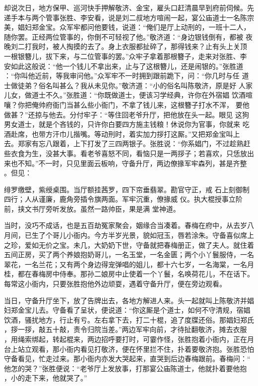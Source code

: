 却说次日，地方保甲、巡河快手押解敬济、金宝，雇头口赶清晨早到府前伺候。先
递手本与两个管事张胜、李安看，说是刘二叔地方喧闹一起，宴公庙道士一名陈宗
美，娼妇郑金宝。众军牢都问他要钱，说道：“俺们是厅上动刑的，一班十二人，
随你罢。正经两位管事的，你倒不可轻视了他。”敬济道：“身边银钱倒有，都被
夜晚刘二打我时，被人掏摸的去了。身上衣服都扯碎了，那得钱来？止有头上关顶
一根银簪儿，拔下来，与二位管事的罢。”众牢子拿着那根簪子，走来对张胜、李
安如此这般说：“他一个钱儿不拿出来，止与了这根簪儿，还是闹银的。”张胜道
：“你叫他近前，等我审问他。”众军牢不一时拥到跟前跪下，问：“你几时与任
道士做徒弟？俗名叫甚么？我从未见你。”敬济道：“小的俗名叫陈敬济，原是好
人家儿女，做道士不久。”张胜道：“你既做道士，便该习学经典，许你在外宿娼
饮酒喧嚷？你把俺帅府衙门当甚么些小衙门，不拿了钱儿来，这根簪子打水不浑，
要他做甚？”还掠与他去。分付牢子：“等住回老爷升厅，把他放在头一起。眼见
这狗男女道士，就是个吝钱的，只许你白要四方施主钱粮！休说你为官事，你就来
吃酒赴席，也带方汗巾儿揩嘴。等动刑时，着实加力拶打这厮。”又把郑金宝叫上
去。郑家有忘八跟着，上下打发了三四两银子。张胜说：“你系娼门，不过趁熟赶
些衣食为生，没甚大事。看老爷喜怒不同，看恼只是一两拶子；若喜欢，只恁放出
来也不知。”不一时，只见里面云板响，守备升厅，两边僚掾军牢森列，甚是齐整
。但见：

绯罗缴壁，紫绶桌围。当厅额挂茜罗，四下帘垂翡翠。勘官守正，戒
石上刻御制四行；人从谨廉，鹿角旁插令旗两面。军牢沉重，僚掾威
仪。执大棍授事立阶前，挟文书厅旁听发放。虽然一路帅臣，果是满
堂神道。

当时，没巧不成话，也是五百劫冤家聚会，姻缘合当凑着。春梅在府中，从去岁八
月间，已生了个哥儿小衙内。今方半岁光景，貌如冠玉，唇若涂朱。守备喜似席上
之珍，爱如无价之宝。未几，大奶奶下世，守备就把春梅册正，做了夫人。就住着
五间正房，买了两个养娘抱奶哥儿，一名玉堂，一名金匮；两个小丫鬟服侍，一名
翠花，一名兰花；又有两个身边得宠弹唱的姐儿，都十六七岁，一名海棠，一名月
桂，都在春梅房中侍奉。那孙二娘房中止使着一个丫鬟，名唤荷花儿，不在话下。
每常这小衙内，只要张胜抱他外边顽耍，遇着守备升厅，便在旁边观看。

当日，守备升厅坐下，放了告牌出去，各地方解进人来。头一起就叫上陈敬济并娼
妇郑金宝儿去。守备看了呈状，便说道：“你这厮是个道士，如何不守清规，宿娼
饮酒，骚扰地方，行止有亏。左右拿下去，打二十棍，追了度牒还俗。那娼妇郑氏
，拶一拶，敲五十敲，责令归院当差。”两边军牢向前，才待扯翻敬济，摊去衣服
，用绳索绑起，转起棍来，两边招呼要打时，可霎作怪，张胜抱着小衙内，正在月
台上站立观看，那小衙内看见打敬济，便在怀里拦不住，扑着要敬济抱。张胜恐怕
守备看见，忙走过来。那小衙内亦发大哭起来，直哭到后边春梅跟前。春梅问：“
他怎的哭？”张胜便说：“老爷厅上发放事，打那宴公庙陈道士，他就扑着要他抱
，小的走下来，他就哭了。”


